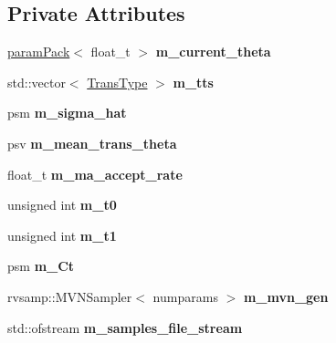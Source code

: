 \subsection*{Private Attributes}
\begin{DoxyCompactItemize}
\item 
\mbox{\label{classada__rwmh_a1640d72a3c8527ec1f8e852bb3528478}} 
\hyperlink{classparamPack}{param\+Pack}$<$ float\+\_\+t $>$ {\bfseries m\+\_\+current\+\_\+theta}
\item 
\mbox{\label{classada__rwmh_ae482d387ff42e61bb2b639e7b9adcf1f}} 
std\+::vector$<$ \hyperlink{param__transforms_8h_acee593b112f4fc85f850631b9c6aaae9}{Trans\+Type} $>$ {\bfseries m\+\_\+tts}
\item 
\mbox{\label{classada__rwmh_a8a33cccbf4a3f3f79d2c5648b7ed6ade}} 
psm {\bfseries m\+\_\+sigma\+\_\+hat}
\item 
\mbox{\label{classada__rwmh_ac0c5ef385c8e92458701f8a24536226b}} 
psv {\bfseries m\+\_\+mean\+\_\+trans\+\_\+theta}
\item 
\mbox{\label{classada__rwmh_ada2efc6c92c36f576cf82aab7f6b4edf}} 
float\+\_\+t {\bfseries m\+\_\+ma\+\_\+accept\+\_\+rate}
\item 
\mbox{\label{classada__rwmh_a1cc1c6f7354098826cca89d2be20f26d}} 
unsigned int {\bfseries m\+\_\+t0}
\item 
\mbox{\label{classada__rwmh_a4eb4ddfc05f7268ebeb94becf7e97479}} 
unsigned int {\bfseries m\+\_\+t1}
\item 
\mbox{\label{classada__rwmh_a444fd1fd9a89d1cfe65a91d5c3f78804}} 
psm {\bfseries m\+\_\+\+Ct}
\item 
\mbox{\label{classada__rwmh_abefded0f465feca0978c62a23272f6e7}} 
rvsamp\+::\+M\+V\+N\+Sampler$<$ numparams $>$ {\bfseries m\+\_\+mvn\+\_\+gen}
\item 
\mbox{\label{classada__rwmh_a69dacf852ca273699f0feeb01eede483}} 
std\+::ofstream {\bfseries m\+\_\+samples\+\_\+file\+\_\+stream}

\end{DoxyCompactItemize}
